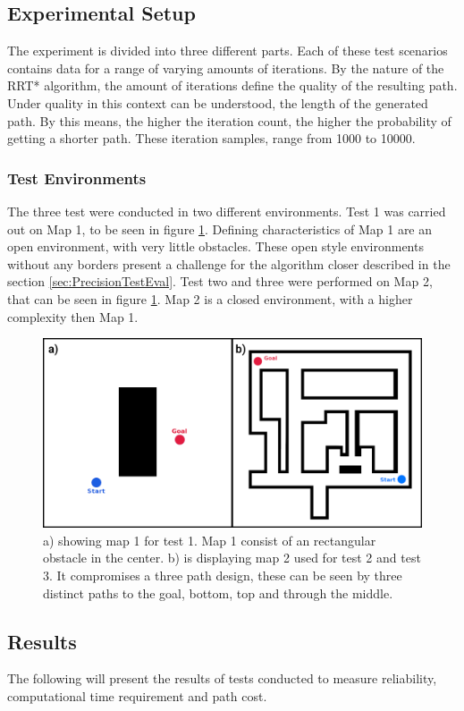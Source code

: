 \subsection{Experimental Setup}
The experiment is divided into three different parts. Each of these test scenarios contains data for a range of varying amounts of iterations. By the nature of the RRT* algorithm, the amount of iterations define the quality of the resulting path. Under quality in this context can be understood, the length of the generated path. By this means, the higher the iteration count, the higher the probability of getting a shorter path. These iteration samples, range from 1000 to 10000. 

\subsubsection{Test Environments}

The three test were conducted in two different environments. Test 1 was carried out on Map 1, to be seen in figure \ref{fig:PrecisionTestMaps}. Defining characteristics of Map 1 are an open environment, with very little obstacles. These open style environments without any borders present a challenge for the algorithm closer described in the section \ref{sec:PrecisionTestEval}. Test two and three were performed on Map 2, that can be seen in figure \ref{fig:PrecisionTestMaps}. Map 2 is a closed environment, with a higher complexity then Map 1.  

\begin{figure}[h]
	\centering
	\includegraphics[width=0.65\linewidth]{img/ppTestMaps}
	\caption{a) showing map 1 for test 1. Map 1 consist of an rectangular obstacle in the center. b) is displaying map 2 used for test 2 and test 3. It compromises a three path design, these can be seen by three distinct paths to the goal, bottom, top and through the middle.}
	\label{fig:PrecisionTestMaps}
\end{figure}


\subsection{Results}
\label{sec:PrecisionTestResults}
The following will present the results of tests conducted to measure reliability, computational time requirement and path cost.

